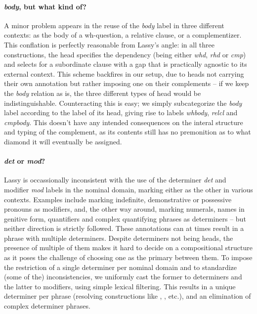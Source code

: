 \paragraph{\textit{body}, but what kind of?}
A minor problem appears in the reuse of the \textit{body} label in three different contexts: as the body of a wh-question, a relative clause, or a complementizer.
This conflation is perfectly reasonable from Lassy's angle: in all three constructions, the head specifies the dependency (being either \textit{whd}, \textit{rhd} or \textit{cmp}) and selects for a subordinate clause with a gap that is practically agnostic to its external context.
This scheme backfires in our setup, due to heads not carrying their own annotation but rather imposing one on their complements -- if we keep the \textit{body} relation as is, the three different types of head would be indistinguishable.
Counteracting this is easy; we simply subcategorize the \textit{body} label according to the label of its head, giving rise to labels \textit{whbody}, \textit{relcl} and \textit{cmpbody}.
This doesn't have any intended consequences on the interal structure and typing of the complement, as its contents still has no premonition as to what diamond it will eventually be assigned.

\paragraph{\textit{det} or \textit{mod}?}
Lassy is occassionally inconsistent with the use of the determiner \textit{det} and modifier \textit{mod} labels in the nominal domain, marking either as the other in various contexts.
Examples include marking indefinite, demonstrative or possessive pronouns as modifiers, and, the other way around, marking numerals, names in genitive form, quantifiers and complex quantifying phrases as determiners -- but neither direction is strictly followed.
These annotations can at times result in a phrase with multiple determiners.
Despite determiners not being heads, the presence of multiple of them makes it hard to decide on a compositional structure as it poses the challenge of choosing one as the primary between them.
To impose the restriction of a single determiner per nominal domain and to standardize (some of the) inconsistencies, we uniformly cast the former to determiners and the latter to modifiers, using simple lexical filtering.
This results in a unique determiner per phrase (resolving constructions like , , etc.), and an elimination of complex determiner phrases.

